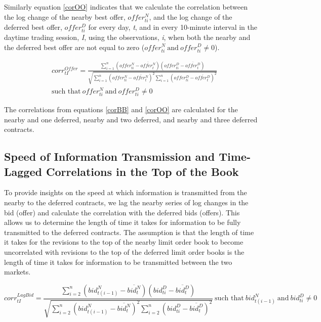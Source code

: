 \documentclass[]{elsarticle} %
\begin{document}
Similarly equation \ref{corOO} indicates that we calculate the
correlation between the log change of the nearby best offer,
\(offer_{ti}^N\), and the log change of the deferred best offer,
\(offer_{ti}^D\) for every day, \emph{t}, and in every 10-minute
interval in the daytime trading session, \emph{I}, using the
observations, \emph{i}, when both the nearby and the deferred best offer
are not equal to zero
(\({offer_{ti}^N \: \textrm{and} \: offer_{ti}^D} \neq 0\)).

\begin{equation} \label{corOO}
\begin{split}
& corr^{Offer}_{tI} = \frac{\sum\limits_{i=1}^{n} \left(offer_{ti}^N - \overline{offer_t^N}\right) \left(offer_{ti}^D - \overline{offer_t^D}\right)}{\sqrt{\sum\limits_{i=1}^{n} \left(offer_{ti}^N - \overline{offer_t^N}\right)^2 \sum\limits_{i=1}^{n}\left(offer_{ti}^D - \overline{offer_t^D}\right)^2}} \\
& \textrm{such that} \: {offer_{ti}^N \: \textrm{and} \: offer_{ti}^D} \neq 0 
\end{split}
\end{equation}

The correlations from equations \ref{corBB} and \ref{corOO} are
calculated for the nearby and one deferred, nearby and two deferred, and
nearby and three deferred contracts.

\subsection{Speed of Information Transmission and Time-Lagged
Correlations in the Top of the
Book}\label{speed-of-information-transmission-and-time-lagged-correlations-in-the-top-of-the-book}

To provide insights on the speed at which information is transmitted
from the nearby to the deferred contracts, we lag the nearby series of
log changes in the bid (offer) and calculate the correlation with the
deferred bids (offers). This allows us to determine the length of time
it takes for information to be fully transmitted to the deferred
contracts. The assumption is that the length of time it takes for the
revisions to the top of the nearby limit order book to become
uncorrelated with revisions to the top of the deferred limit order books
is the length of time it takes for information to be transmitted between
the two markets.

\begin{equation} \label{corLBB}
corr^{LagBid}_{tI} = \frac{\sum\limits_{i=2}^{n} \left(bid_{t(i-1)}^N - \overline{bid_t^N}\right) \left(bid_{ti}^D - \overline{bid_t^D}\right)}{\sqrt{\sum\limits_{i=2}^{n} \left(bid_{t(i-1)}^N - \overline{bid_t^N}\right)^2 \sum\limits_{i=2}^{n}\left(bid_{ti}^D - \overline{bid_t^D}\right)^2}} \: \textrm{such that} \: {bid_{t(i-1)}^N \: \textrm{and} \: bid_{ti}^D} \neq 0
\end{equation}
\end{document}
